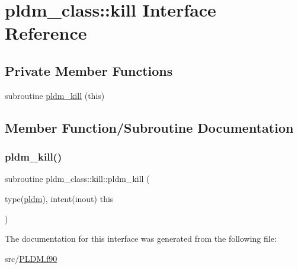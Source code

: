 \hypertarget{interfacepldm__class_1_1kill}{}\section{pldm\+\_\+class\+:\+:kill Interface Reference}
\label{interfacepldm__class_1_1kill}
\subsection*{Private Member Functions}
\begin{DoxyCompactItemize}
\item 
subroutine \hyperlink{interfacepldm__class_1_1kill_a5c35adf2fa6446e2fa90c695a043a26a}{pldm\+\_\+kill} (this)
\end{DoxyCompactItemize}


\subsection{Member Function/\+Subroutine Documentation}
\mbox{\label{interfacepldm__class_1_1kill_a5c35adf2fa6446e2fa90c695a043a26a}} 
\subsubsection{\texorpdfstring{pldm\+\_\+kill()}{pldm\_kill()}}
{\footnotesize\ttfamily subroutine pldm\+\_\+class\+::kill\+::pldm\+\_\+kill (\begin{DoxyParamCaption}\item[{type(\hyperlink{structpldm__class_1_1pldm}{pldm}), intent(inout)}]{this }\end{DoxyParamCaption})\hspace{0.3cm}{\ttfamily [private]}}



The documentation for this interface was generated from the following file\+:\begin{DoxyCompactItemize}
\item 
src/\hyperlink{_p_l_d_m_8f90}{P\+L\+D\+M.\+f90}\end{DoxyCompactItemize}
